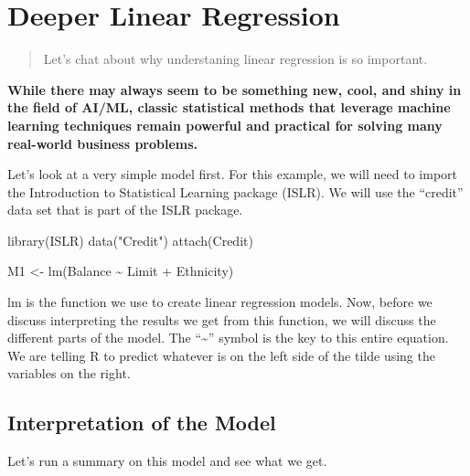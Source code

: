 \documentclass[
]{book}
\newenvironment{Shaded}{\begin{snugshade}}{\end{snugshade}}
\newcommand{\FunctionTok}[1]{\textcolor[rgb]{0.00,0.00,0.00}{#1}}
\newcommand{\NormalTok}[1]{#1}
\newcommand{\OtherTok}[1]{\textcolor[rgb]{0.56,0.35,0.01}{#1}}
\newcommand{\SpecialCharTok}[1]{\textcolor[rgb]{0.00,0.00,0.00}{#1}}
\newcommand{\StringTok}[1]{\textcolor[rgb]{0.31,0.60,0.02}{#1}}
\begin{document}
\hypertarget{deeper-linear-regression}{%
\chapter{Deeper Linear Regression}\label{deeper-linear-regression}}

\begin{quote}
Let's chat about why understaning linear regression is so important.
\end{quote}

\textbf{While there may always seem to be something new, cool, and shiny in the field of AI/ML, classic statistical methods that leverage machine learning techniques remain powerful and practical for solving many real-world business problems.}

Let's look at a very simple model first. For this example, we will need to import the Introduction to Statistical Learning package (ISLR). We will use the ``credit'' data set that is part of the ISLR package.

\begin{Shaded}
\begin{Highlighting}[]
\FunctionTok{library}\NormalTok{(ISLR)}
\FunctionTok{data}\NormalTok{(}\StringTok{"Credit"}\NormalTok{)}
\FunctionTok{attach}\NormalTok{(Credit)}

\NormalTok{M1 }\OtherTok{\textless{}{-}} \FunctionTok{lm}\NormalTok{(Balance }\SpecialCharTok{\textasciitilde{}}\NormalTok{ Limit }\SpecialCharTok{+}\NormalTok{ Ethnicity)}
\end{Highlighting}
\end{Shaded}

lm is the function we use to create linear regression models. Now, before we discuss interpreting the results we get from this function, we will discuss the different parts of the model. The ``\textasciitilde{}'' symbol is the key to this entire equation. We are telling R to predict whatever is on the left side of the tilde using the variables on the right.

\hypertarget{interpretation-of-the-model}{%
\section{Interpretation of the Model}\label{interpretation-of-the-model}}

Let's run a summary on this model and see what we get.
\end{document}
